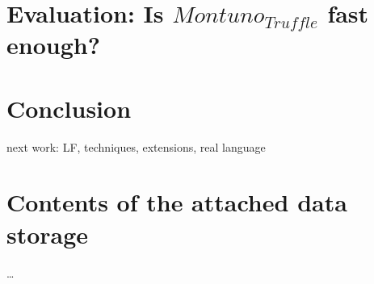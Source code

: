 \documentclass[english,zadani,odsaz]{fitthesis}
\begin{document}
\chapter{Evaluation: Is \(Montuno_{Truffle}\) fast enough?}
\label{sec:orgc3a5ddb}
\chapter{Conclusion}
\label{sec:orgd3fcece}
next work: LF, techniques, extensions, real language


\makeatletter
\def\@openbib@code{\addcontentsline{toc}{chapter}{Bibliography}}
\makeatother
\begin{flushleft}




\end{flushleft}
\iftwoside\cleardoublepage\fi
\appendix
\appendixpage
\iftwoside\cleardoublepage\fi
\startcontents[chapters]
\iftwoside\cleardoublepage\fi

\chapter{Contents of the attached data storage}
\label{sec:orgcf644f0}
\ldots{}
\end{document}
